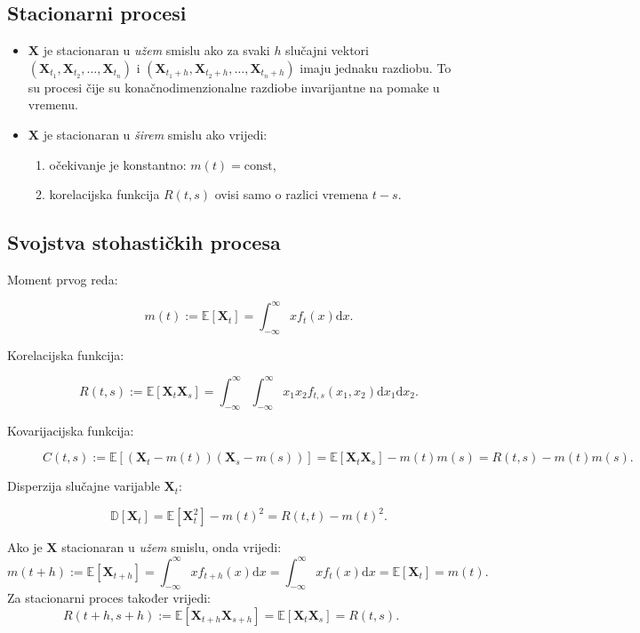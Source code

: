 \documentclass[12pt,english]{article}
\begin{document}
\subsection{Stacionarni procesi}
\begin{itemize}
  \item $\mathbf X$ je stacionaran u \emph{užem} smislu ako za svaki $h$ slučajni vektori $\left( \mathbf X_{t_1}, \mathbf X_{t_2}, \ldots, \mathbf X_{t_n}\right)$ i  $\left( \mathbf X_{t_1+h}, \mathbf X_{t_2+h}, \ldots, \mathbf X_{t_n+h}\right)$ imaju jednaku razdiobu. To su procesi čije su konačnodimenzionalne razdiobe invarijantne na pomake u vremenu.

  \item $\mathbf X$ je stacionaran u \emph{širem} smislu ako vrijedi:
  \begin{enumerate}
    \item očekivanje je konstantno: $m(t) = \text{const}$,
    \item korelacijska funkcija $R(t,s)$ ovisi samo o razlici vremena $t-s$.
  \end{enumerate}
\end{itemize}

\subsection{Svojstva stohastičkih procesa}
\begin{description}
  \item[Moment prvog reda:]
  $$m(t) := \mathbb E\left[ \mathbf X_t\right] = \int_{-\infty}^\infty xf_t(x)\mathrm{d}x.$$
  \item[Korelacijska funkcija:]
  $$R(t,s) := \mathbb E\left[\mathbf X_t \mathbf X_s\right] = \int_{-\infty}^\infty \int_{-\infty}^\infty x_1x_2f_{t,s}(x_1,x_2)\mathrm dx_1\mathrm dx_2.$$
  \item[Kovarijacijska funkcija:]
  $$C(t,s) := \mathbb E\left[(\mathbf X_t - m(t))(\mathbf X_s-m(s))\right] = \mathbb E\left[\mathbf X_t\mathbf X_s\right] -m(t)m(s) = R(t,s)-m(t)m(s).$$
  \item[Disperzija slučajne varijable $\mathbf X_t$:]
  $$\mathbb D\left[\mathbf X_t\right] = \mathbb E\left[\mathbf X_t^2\right] - m(t)^2 = R(t,t) - m(t)^2.$$
\end{description}
Ako je $\mathbf X$ stacionaran u \emph{užem} smislu, onda vrijedi:
  $$m(t+h) := \mathbb E\left[ \mathbf X_{t+h}\right] = \int_{-\infty}^\infty xf_{t+h}(x)\mathrm{d}x = \int_{-\infty}^\infty xf_{t}(x)\mathrm{d}x = \mathbb E\left[\mathbf X_t\right] = m(t).$$
Za stacionarni proces također vrijedi:
$$R(t+h,s+h) := \mathbb E\left[\mathbf X_{t+h} \mathbf X_{s+h}\right] = \mathbb E\left[\mathbf X_t \mathbf X_s\right] = R(t,s).$$
\end{document}
